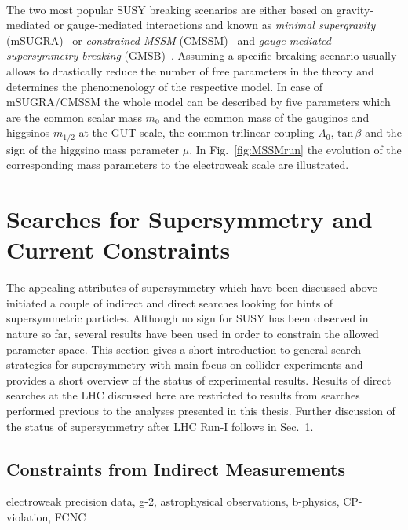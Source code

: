 \\
The two most popular SUSY breaking scenarios are either based on gravity-mediated or gauge-mediated interactions and known as \textit{minimal supergravity} (mSUGRA)~\cite{Chamseddine:1982jx, AlvarezGaume:1983gj} or \textit{constrained MSSM} (CMSSM)~\cite{Kane:1993td, Baer:2002gm} and \textit{gauge-mediated supersymmetry breaking} (GMSB)~\cite{Dine:1981gu, AlvarezGaume:1981wy}. Assuming a specific breaking scenario usually allows to drastically reduce the number of free parameters in the theory and determines the phenomenology of the respective model. In case of mSUGRA/CMSSM the whole model can be described by five parameters which are the common scalar mass $m_0$ and the common mass of the gauginos and higgsinos $m_{1/2}$ at the GUT scale, the common trilinear coupling $A_0$, $\mathrm{tan} \, \beta$ and the sign of the higgsino mass parameter $\mu$. In Fig.~\ref{fig:MSSMrun} the evolution of the corresponding mass parameters to the electroweak scale are illustrated.  

\section{Searches for Supersymmetry and Current Constraints}
\label{sec:susy_status}
The appealing attributes of supersymmetry which have been discussed above initiated a couple of indirect and direct searches looking for hints of supersymmetric particles. Although no sign for SUSY has been observed in nature so far, several results have been used in order to constrain the allowed parameter space. This section gives a short introduction to general search strategies for supersymmetry with main focus on collider experiments and provides a short overview of the status of experimental results. Results of direct searches at the LHC discussed here are restricted to results from searches performed previous to the analyses presented in this thesis. Further discussion of the status of supersymmetry after LHC Run-I follows in Sec.~\ref{sec:susy_status}.  

\subsection{Constraints from Indirect Measurements}
\label{subsec:susy_indirect}
electroweak precision data, g-2, astrophysical observations, b-physics, CP-violation, FCNC

